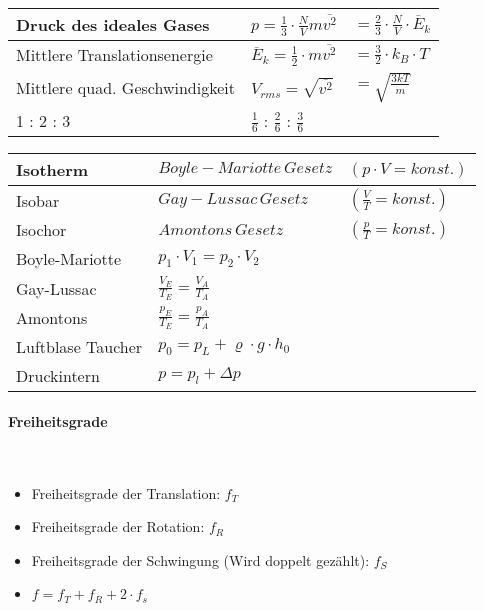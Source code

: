 \begin{tabularx}{\columnwidth}{@{}XXX@{}}
	Druck des ideales Gases                & $p = \frac{1}{3}\cdot\frac{N}{V}m\overline{v^2}$     & $= \frac{2}{3}\cdot\frac{N}{V}\cdot\overline{E}_k$   \\ \hline
	Mittlere Translationsenergie           & $\overline{E}_k = \frac{1}{2}\cdot m \overline{v^2}$ & $= \frac{3}{2}\cdot k_B \cdot T$                     \\ \hline
	Mittlere quad. Geschwindigkeit         & $V_{rms} = \sqrt{\overline{v^2}}$                    & $= \sqrt{\frac{3kT}{m}}$                             \\ \hline
	1 : 2 : 3                              & $\frac{1}{6}$ : $\frac{2}{6}$ : $\frac{3}{6}$                                                               \\ \hline
\end{tabularx}

\noindent
\begin{tabularx}{\columnwidth}{@{}XXX@{}}
	Isotherm          & $Boyle-Mariotte\,Gesetz$                 & $(p\cdot V = konst.)$    \\ \hline
	Isobar            & $Gay-Lussac\,Gesetz$                     & $(\frac{V}{T} = konst.)$ \\ \hline
	Isochor           & $Amontons\,Gesetz$                       & $(\frac{p}{T} = konst.)$ \\ \hline
	Boyle-Mariotte    & $p_1\cdot V_1 = p_2\cdot V_2$                                       \\ \hline
	Gay-Lussac        & $\frac{V_E}{T_E} = \frac{V_A}{T_A}$                                 \\ \hline
	Amontons          & $\frac{p_E}{T_E} = \frac{p_A}{T_A}$                                 \\ \hline
	Luftblase Taucher & $p_0 = p_L + \varrho \cdot  g \cdot h_0$                            \\ \hline
	Druckintern       & $p = p_l + \Delta p$                                                \\ \hline
\end{tabularx}
\vspace{1mm}

\paragraph{Freiheitsgrade}\mbox{}\\
\noindent
\begin{itemize}
	\item Freiheitsgrade der Translation: $f_T$
	\item Freiheitsgrade der Rotation: $f_R$
	\item Freiheitsgrade der Schwingung (Wird doppelt gezählt): $f_S$
	\item $f = f_T + f_R + 2\cdot f_s$
\end{itemize}

